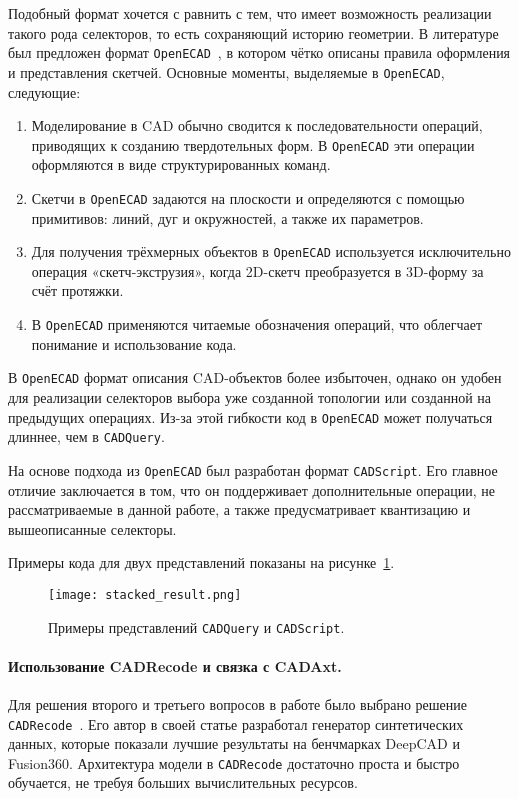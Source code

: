Подобный формат хочется с равнить с тем, что имеет возможность реализации такого рода селекторов, то есть сохраняющий историю геометрии.
В литературе был предложен формат \texttt{OpenECAD}~\cite{yuan24_openecad}, в котором чётко описаны правила
оформления и представления скетчей. Основные моменты, выделяемые в \texttt{OpenECAD}, следующие:
\begin{enumerate}
    \item Моделирование в CAD обычно сводится к последовательности операций, приводящих к созданию твердотельных форм.
          В \texttt{OpenECAD} эти операции оформляются в виде структурированных команд.
    \item Скетчи в \texttt{OpenECAD} задаются на плоскости и определяются с помощью примитивов:
          линий, дуг и окружностей, а также их параметров.
    \item Для получения трёхмерных объектов в \texttt{OpenECAD} используется исключительно операция
          «скетч-экструзия», когда 2D-скетч преобразуется в 3D-форму за счёт протяжки.
    \item В \texttt{OpenECAD} применяются читаемые обозначения операций, что облегчает понимание
          и использование кода.
\end{enumerate}

В \texttt{OpenECAD} формат описания CAD-объектов более избыточен, однако он удобен для реализации селекторов выбора уже созданной топологии или созданной на предыдущих операциях.
Из-за этой гибкости код в \texttt{OpenECAD} может получаться длиннее, чем в  \texttt{CADQuery}.

На основе подхода из \texttt{OpenECAD} был разработан формат \texttt{CADScript}. Его главное отличие
заключается в том, что он поддерживает дополнительные операции, не рассматриваемые в данной работе,
а также предусматривает квантизацию и вышеописанные селекторы.

Примеры кода для двух представлений показаны на рисунке~\ref{fig:cadformats}.

\begin{figure}[h!]
    \centering
    \texttt{[image: stacked\_result.png]}
    \caption{Примеры представлений \texttt{CADQuery} и \texttt{CADScript}.}
    \label{fig:cadformats}
\end{figure}

\paragraph{Использование CADRecode и связка с CADAxt.}
Для решения второго и третьего вопросов в работе было выбрано решение
\texttt{CADRecode}~\cite{rukhovich24_cadrecode}. Его автор в своей статье разработал генератор синтетических
данных, которые показали лучшие результаты на бенчмарках DeepCAD и Fusion360.
Архитектура модели в \texttt{CADRecode} достаточно проста и быстро обучается,
не требуя больших вычислительных ресурсов.

